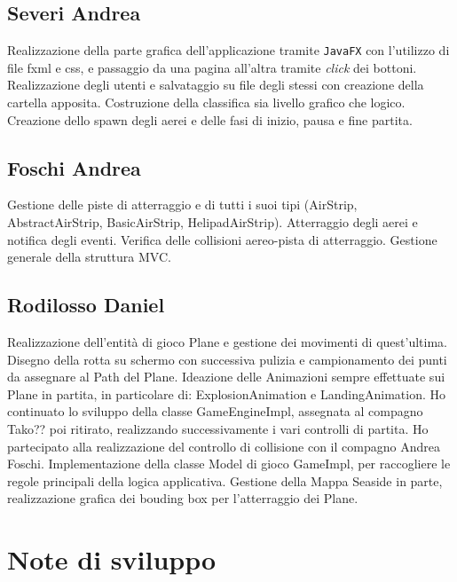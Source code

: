 \documentclass[a4paper,12pt]{report}
\begin{document}
\subsection{Severi Andrea}
Realizzazione della parte grafica dell'applicazione tramite \texttt{JavaFX} con l'utilizzo di file fxml e css, e passaggio da una pagina all'altra tramite \textit{click} dei bottoni. 
\\
Realizzazione degli utenti e salvataggio su file degli stessi con creazione della cartella apposita. Costruzione della classifica sia livello grafico che logico. 
\\
Creazione dello spawn degli aerei e delle fasi di inizio, pausa e fine partita.

\subsection{Foschi Andrea}
Gestione delle piste di atterraggio e di tutti i suoi tipi (AirStrip, AbstractAirStrip, BasicAirStrip, HelipadAirStrip). Atterraggio degli aerei e notifica degli eventi. Verifica delle collisioni aereo-pista di atterraggio. Gestione generale della struttura MVC.

\subsection{Rodilosso Daniel}
Realizzazione dell’entità di gioco Plane e gestione dei movimenti di quest’ultima.
Disegno della rotta su schermo con successiva pulizia e campionamento dei punti da assegnare al Path del Plane.
Ideazione delle Animazioni sempre effettuate sui Plane in partita, in particolare di: ExplosionAnimation e LandingAnimation.
Ho continuato lo sviluppo della classe GameEngineImpl, assegnata al compagno Tako?? poi ritirato, realizzando successivamente i 
vari controlli di partita.
Ho partecipato alla realizzazione del controllo di collisione con il compagno Andrea Foschi.
Implementazione della classe Model di gioco GameImpl, per raccogliere le regole principali della logica applicativa.
Gestione della Mappa Seaside in parte, realizzazione grafica dei bouding box per l’atterraggio dei Plane.

\section{Note di sviluppo}
\end{document}

